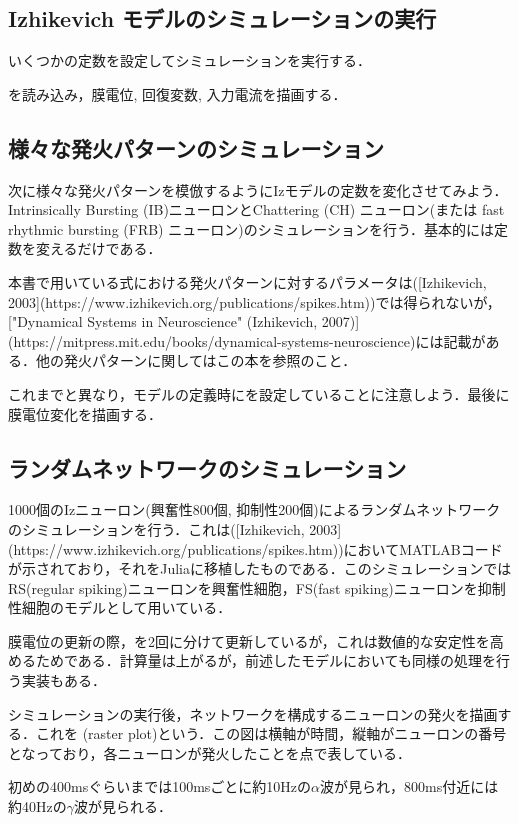 \subsection{Izhikevich モデルのシミュレーションの実行}
いくつかの定数を設定してシミュレーションを実行する．

を読み込み，膜電位, 回復変数, 入力電流を描画する．


\subsection{様々な発火パターンのシミュレーション}
次に様々な発火パターンを模倣するようにIzモデルの定数を変化させてみよう．Intrinsically Bursting (IB)ニューロンとChattering (CH) ニューロン(または fast rhythmic bursting (FRB) ニューロン)のシミュレーションを行う．基本的には定数を変えるだけである．

本書で用いている式における発火パターンに対するパラメータは([Izhikevich, 2003](https://www.izhikevich.org/publications/spikes.htm))では得られないが，["Dynamical Systems in Neuroscience" (Izhikevich, 2007)](https://mitpress.mit.edu/books/dynamical-systems-neuroscience)には記載がある．他の発火パターンに関してはこの本を参照のこと．

これまでと異なり，モデルの定義時にを設定していることに注意しよう．最後に膜電位変化を描画する．


\subsection{ランダムネットワークのシミュレーション}
1000個のIzニューロン(興奮性800個, 抑制性200個)によるランダムネットワークのシミュレーションを行う．これは([Izhikevich, 2003](https://www.izhikevich.org/publications/spikes.htm))においてMATLABコードが示されており，それをJuliaに移植したものである．このシミュレーションではRS(regular spiking)ニューロンを興奮性細胞，FS(fast spiking)ニューロンを抑制性細胞のモデルとして用いている．

膜電位の更新の際，を2回に分けて更新しているが，これは数値的な安定性を高めるためである．計算量は上がるが，前述したモデルにおいても同様の処理を行う実装もある．

シミュレーションの実行後，ネットワークを構成するニューロンの発火を描画する．これを\textbf{} (raster plot)という．この図は横軸が時間，縦軸がニューロンの番号となっており，各ニューロンが発火したことを点で表している．


初めの400msぐらいまでは100msごとに約10Hzの$\alpha$波が見られ，800ms付近には約40Hzの$\gamma$波が見られる．
